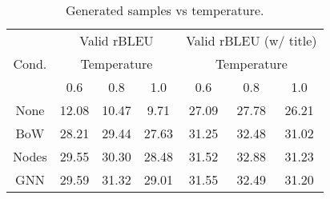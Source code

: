 \documentclass[11pt]{article}
\begin{document}
\begin{table*}[h]
    \centering
    \begin{tabular}{c|c|c|c|c|c|c}
    \hline
        \multirow{3}{*}{Cond.} & \multicolumn{3}{c|}{Valid rBLEU} & \multicolumn{3}{c}{Valid rBLEU (w/ title)} \\ \cline{2-7}
        & \multicolumn{3}{c|}{Temperature} & \multicolumn{3}{c}{Temperature} \\ \cline{2-7}
         & 0.6 & 0.8 & 1.0 & 0.6 & 0.8 & 1.0 \\
        \hline
        None & 12.08 & 10.47 & 9.71 & 27.09 & 27.78 & 26.21 \\
        BoW & 28.21 & 29.44 & 27.63 & 31.25 & 32.48 & 31.02 \\
        Nodes & 29.55 & 30.30 & 28.48 & 31.52 & 32.88 & 31.23 \\
        GNN & 29.59 & 31.32 & 29.01 & 31.55 & 32.49 & 31.20 \\
    \hline
    \end{tabular}
    \caption{Generated samples vs temperature.}
    \label{tab:sampling_temperature}
\end{table*}
\end{document}
